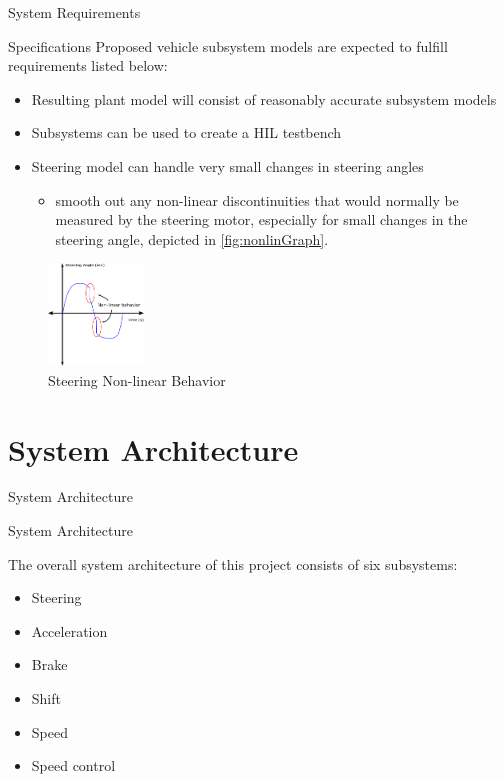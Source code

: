 \documentclass{beamer}
\begin{document}
\begin{frame}{System Requirements}
  \begin{block}{Specifications}
    Proposed vehicle subsystem models are expected to fulfill requirements listed below:
\begin{itemize}
    \item Resulting plant model will consist of reasonably accurate subsystem models
    \item Subsystems can be used to create a HIL testbench
    \item Steering model can handle very small changes in steering angles
    \begin{itemize}
    		\item smooth out any non-linear discontinuities that would normally be measured by the steering motor, especially for small changes in the steering angle, depicted in \autoref{fig:nonlinGraph}.
    \end{itemize}
\end{itemize}
\begin{figure}[h]
    \centering
    \captionsetup{justification=centering, margin=3cm}
    \includegraphics[width=1in]{figs/inkscape/nonlinearBehavior}
    \caption{Steering Non-linear Behavior}
    \label{fig:nonlinGraph}
\end{figure}
  \end{block}
\end{frame}


\section{System Architecture}

\begin{frame}{System Architecture}
  \begin{block}{System Architecture}
    \begin{large}
      The overall system architecture of this project consists of six subsystems: 
      \begin{itemize}
          \item Steering
          \item Acceleration
          \item Brake %
          \item Shift %
          \item Speed %
          \item Speed control %
        \end{itemize} 
    \end{large}
  \end{block}
\end{frame}
\end{document}

